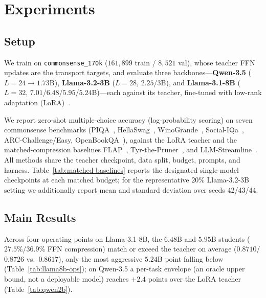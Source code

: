 \documentclass[letterpaper]{article} %
\theoremstyle{plain}
\theoremstyle{definition}
\begin{document}
\section{Experiments}
\label{sec:experiments}
\subsection{Setup}
\label{sec:setup}
We train on \texttt{commonsense\_170k} ($161{,}899$ train / $8{,}521$ val),
whose teacher FFN updates are the transport targets, and evaluate three
backbones---\textbf{Qwen-3.5} ($L\!=\!24\!\to\!1.73$B),
\textbf{Llama-3.2-3B} ($L\!=\!28$, $2.25$/$3$B), and \textbf{Llama-3.1-8B}
($L\!=\!32$, $7.01$/$6.48$/$5.95$/$5.24$B)---each against its teacher,
fine-tuned with low-rank adaptation (LoRA)~\citep{hu2022lora}.

We report zero-shot multiple-choice accuracy (log-probability scoring) on seven
commonsense benchmarks (PIQA~\citep{bisk2020piqa},
HellaSwag~\citep{zellers2019hellaswag},
WinoGrande~\citep{sakaguchi2021winogrande},
Social-IQa~\citep{sap2019socialiqa}, ARC-Challenge/Easy,
OpenBookQA~\citep{mihaylov2018openbookqa}), against the LoRA teacher and the
matched-compression baselines FLAP~\citep{flap},
Tyr-the-Pruner~\citep{Li2025TyrThePruner}, and
LLM-Streamline~\citep{chen2025streamlining}. All methods share the teacher
checkpoint, data split, budget, prompts, and harness. Table~\ref{tab:matched-baselines}
reports the designated single-model checkpoints at each matched budget; for the
representative $20\%$ Llama-3.2-3B setting we additionally report mean and
standard deviation over seeds 42/43/44.

\subsection{Main Results}
\label{sec:main}
Across four operating points on Llama-3.1-8B, the $6.48$B and $5.95$B students
($27.5\%$/$36.9\%$ FFN compression) match or exceed the teacher on average
($0.8710$/$0.8726$ vs.\ $0.8617$), only the most aggressive $5.24$B point falling
below (Table~\ref{tab:llama8b-ops}); on Qwen-3.5 a per-task envelope (an oracle
upper bound, not a deployable model) reaches $+2.4$ points over the LoRA teacher
(Table~\ref{tab:qwen2b}).


\end{document}
